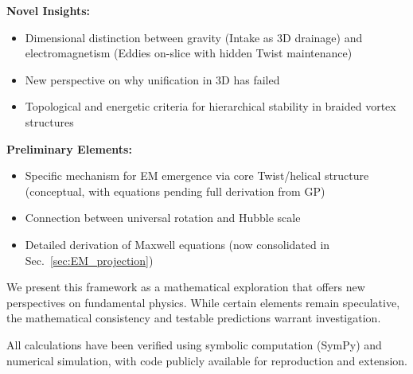 \textbf{Novel Insights:}
\begin{itemize}
\item Dimensional distinction between gravity (Intake as 3D drainage) and electromagnetism (Eddies on-slice with hidden Twist maintenance)
\item New perspective on why unification in 3D has failed
\item Topological and energetic criteria for hierarchical stability in braided vortex structures
\end{itemize}

\textbf{Preliminary Elements:}
\begin{itemize}
\item Specific mechanism for EM emergence via core Twist/helical structure (conceptual, with equations pending full derivation from GP)
\item Connection between universal rotation and Hubble scale
\item Detailed derivation of Maxwell equations (now consolidated in Sec.~\ref{sec:EM_projection})
\end{itemize}

We present this framework as a mathematical exploration that offers new perspectives on fundamental physics. While certain elements remain speculative, the mathematical consistency and testable predictions warrant investigation.

All calculations have been verified using symbolic computation (SymPy) and numerical simulation, with code publicly available for reproduction and extension.
